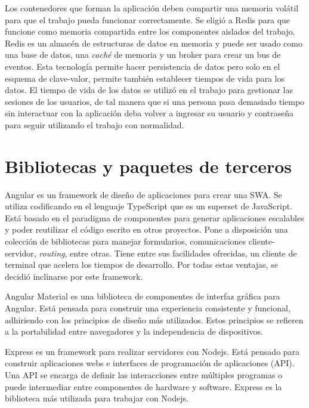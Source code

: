 Los contenedores que forman la aplicación deben compartir una memoria volátil para que el trabajo pueda funcionar correctamente. Se eligió a Redis para que funcione como memoria compartida entre los componentes aislados del trabajo.
Redis es un almacén de estructuras de datos en memoria y puede ser usado como una base de datos, una \emph{caché} de memoria y un broker para crear un bus de eventos.
Esta tecnología permite hacer persistencia de datos pero solo en el esquema de clave-valor, permite también establecer tiempos de vida para los datos.
El tiempo de vida de los datos se utilizó en el trabajo para gestionar las sesiones de los usuarios, de tal manera que si una persona pasa demasiado tiempo sin interactuar con la aplicación deba volver a ingresar su usuario y contraseña para seguir utilizando el trabajo con normalidad.	
	
\section{Bibliotecas y paquetes de terceros}

Angular es un framework de diseño de aplicaciones para crear una SWA.
Se utiliza codificando en el lenguaje TypeScript que es un superset de JavaScript.
Está basado en el paradigma de componentes para generar aplicaciones escalables y poder reutilizar el código escrito en otros proyectos.
Pone a disposición una colección de bibliotecas para manejar formularios, comunicaciones cliente-servidor, \emph{routing}, entre otras.
Tiene entre sus facilidades ofrecidas, un cliente de terminal que acelera los tiempos de desarrollo.
Por todas estas ventajas, se decidió inclinarse por este framework.

Angular Material es una biblioteca de componentes de interfaz gráfica para Angular.
Está pensada para construir una experiencia consistente y funcional, adhiriendo con los principios de diseño más utilizados.
Estos principios se refieren a la portabilidad entre navegadores y la independencia de dispositivos.

Express es un framework para realizar servidores con Nodejs.
Está pensado para construir aplicaciones webs e interfaces de programación de aplicaciones (API).
Una API se encarga de definir las interacciones entre múltiples programas o puede intermediar entre componentes de hardware y software.
Express es la biblioteca más utilizada para trabajar con Nodejs. \citep{WEBSITE:Express}

